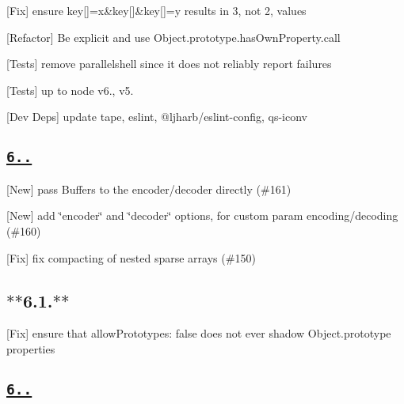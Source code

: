 \begin{DoxyItemize}
\item \mbox{[}Fix\mbox{]} ensure {\ttfamily key\mbox{[}\mbox{]}=x\&key\mbox{[}\mbox{]}\&key\mbox{[}\mbox{]}=y} results in 3, not 2, values
\item \mbox{[}Refactor\mbox{]} Be explicit and use {\ttfamily Object.\+prototype.\+has\+Own\+Property.\+call}
\item \mbox{[}Tests\mbox{]} remove {\ttfamily parallelshell} since it does not reliably report failures
\item \mbox{[}Tests\mbox{]} up to {\ttfamily node} {\ttfamily v6.}, {\ttfamily v5.}
\item \mbox{[}Dev Deps\mbox{]} update {\ttfamily tape}, {\ttfamily eslint}, {\ttfamily @ljharb/eslint-\/config}, {\ttfamily qs-\/iconv}
\end{DoxyItemize}

\subsection*{\href{https://github.com/ljharb/qs/issues?milestone=36&state=closed}{\tt {\bfseries 6..}}}


\begin{DoxyItemize}
\item \mbox{[}New\mbox{]} pass Buffers to the encoder/decoder directly (\#161)
\item \mbox{[}New\mbox{]} add \char`\"{}encoder\char`\"{} and \char`\"{}decoder\char`\"{} options, for custom param encoding/decoding (\#160)
\item \mbox{[}Fix\mbox{]} fix compacting of nested sparse arrays (\#150)
\end{DoxyItemize}

\subsection*{$\ast$$\ast$6.1.$\ast$$\ast$}


\begin{DoxyItemize}
\item \mbox{[}Fix\mbox{]} ensure that {\ttfamily allow\+Prototypes\+: false} does not ever shadow Object.\+prototype properties
\end{DoxyItemize}

\subsection*{\href{https://github.com/ljharb/qs/issues?milestone=35&state=closed}{\tt {\bfseries 6..}}}



